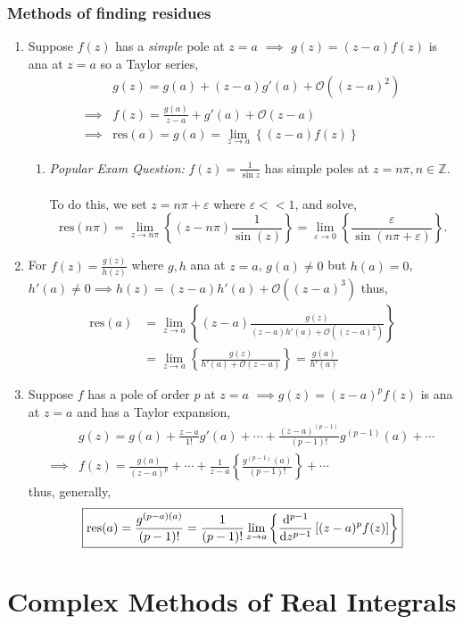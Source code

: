 \documentclass{book}
\begin{document}
\subsubsection{Methods of finding residues}
\begin{enumerate}
	\item Suppose $f(z)$ has a \textit{simple} pole at $z = a$ $\implies$ $g(z) = (z-a)f(z)$ is ana at $z=a$ so a Taylor series,
	\begin{align}
		& g(z) =  g(a) + (z-a)g'(a) + \mathcal{O}\left((z-a)^2\right) \\
		\implies & f(z) = \frac{g(a)}{z-a} + g'(a) + \mathcal{O}(z-a) \\
		\implies & \text{res}(a) = g(a) = \lim_{z \to a}\left\{(z-a)f(z)\right\}
	\end{align}
	\begin{enumerate}
		\item \textit{Popular Exam Question:} $f(z) = \frac{1}{\sin z}$ has simple poles at $z = n\pi, n \in \mathbb{Z}$.
		\\\\
		To do this, we set $z = n\pi + \varepsilon$ where $\varepsilon << 1$, and solve,
		\begin{equation}
			\text{res}(n\pi) = \lim_{z \to n\pi}\left\{(z-n\pi)\frac{1}{\sin(z)}\right\} = \lim_{\varepsilon\to0}\left\{\frac{\varepsilon}{\sin(n\pi + \varepsilon)}\right\}.
		\end{equation}
	\end{enumerate}
	\item For $f(z) = \frac{g(z)}{h(z)}$ where $g,h$ ana at $z=a$, $g(a) \neq 0$ but $h(a) = 0$, $h'(a) \neq 0 \implies h(z) = (z-a)h'(a) + \mathcal{O}\left((z-a)^3\right)$ thus,
	\begin{equation}
		\begin{split}
			\text{res}(a) & = \lim_{z \to a}\left\{(z-a)\frac{g(z)}{(z-a)h'(a) + \mathcal{O}\left((z-a)^2\right)}\right\} \\
			& = \lim_{z \to a}\left\{\frac{g(z)}{h'(a) + \mathcal{O}(z-a)}\right\} = \frac{g(a)}{h'(a)}
		\end{split}
	\end{equation}
	\item Suppose $f$ has a pole of order $p$ at $z = a$ $\implies g(z) = (z-a)^pf(z)$ is ana at $z=a$ and has a Taylor expansion,
	\begin{align}
		& g(z) = g(a) + \frac{z-a}{1!}g'(a) + \cdots + \frac{(z-a)^{(p-1)}}{(p-1)!}g^{(p-1)}(a) + \cdots \\
		\implies & f(z) = \frac{g(a)}{(z-a)^p} + \cdots + \frac{1}{z-a}\left\{\frac{g^{(p-1)}(a)}{(p-1)!}\right\} + \cdots
	\end{align}
	thus, generally,
	\begin{equation}
		\boxed{\text{res}(a) = \frac{g^{(p-a)(a)}}{(p-1)!} = \frac{1}{(p-1)!}\lim_{z\to a}\left\{\dv[p-1]{z}\left[(z-a)^pf(z)\right]\right\}}
	\end{equation}
\end{enumerate}
\section{Complex Methods of Real Integrals}
\end{document}
